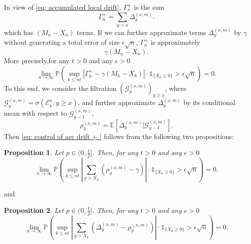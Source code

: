 \documentclass[twoside,12pt,a4paper]{article}
\newtheorem{proposition}{Proposition}[section]
\numberwithin{equation}{section}
\newcommand{\abs}[1]{\left\vert #1 \right\vert}
\begin{document}
	In view of \eqref{eq: accumulated local drift}, $\Gamma_n^+$ is the sum 
	$$
	\Gamma_n^+ = \sum_{y>x} \Delta_y^{(x,m)}.
	$$ which has $(M_n - X_n)$ terms. If we can further approximate terms $\Delta_y^{(x,m)}$ by $\gamma$ without generating a total error of size $\epsilon \sqrt{n}$, $\Gamma_n^+$ is approximately 
	$$   
	\gamma (M_n - X_n).
	$$
	More precisely,for any $t>0$ and any $\epsilon >0$
	\begin{equation}\label{eq: control of acc drift + }
		\lim_{n \to \infty }\mathbb{P}\left(\sup_{k\leq nt} \abs{\Gamma^+_k - \gamma \left(M_k - X_k \right)   }\cdot \mathbb{1}_{\{X_k\geq 0 \}} > \epsilon \sqrt{n}  \right) =0. 
	\end{equation}
	To this end, we consider the filtration $\left(\mathcal{G}_{y}^{(x,m)}\right)_{y\geq x}$, where $ \mathcal{G}_{y}^{(x,m)} = \sigma\left( \mathcal{E}^{n}_y : y \geq x \right)$, and further approximate $\Delta_y^{(x,m)}$ by its conditional mean with respect to $\mathcal{G}_{y-1}^{(x,m)}$,
	\begin{equation}\label{eq: conditional mean}
		\rho_{y}^{(x,m)}= \mathbb{E}\left[\Delta_y^{(x,m)} | \mathcal{G}_{y-1}^{(x,m)}\right].
	\end{equation}
	Then \eqref{eq: control of acc drift + } follows from the following two propositions:
	\begin{proposition}\label{lm: approximation of means of local drift}
		Let $p\in (0,\frac{1}{2}]$. Then, for any $t>0$ and any $\epsilon >0$
		\begin{equation}\label{eq: control of expected local drift}
			\lim_{n \to \infty }\mathbb{P}\left(\sup_{k\leq nt} \abs{\sum_{y> X_k} \left( \rho_{y}^{(x,m)} - \gamma  \right)   }\cdot\mathbb{1}_{\{X_k\geq 0\}} > \epsilon \sqrt{n}  \right) =0. 
		\end{equation}
	\end{proposition}
	and
	\begin{proposition}\label{lm: approx local drift by conditional means}
		Let $p\in (0,\frac{1}{2}]$. Then, for any $t>0$ and any $\epsilon >0$
		\begin{equation}\label{eq: control of martingale difference for local drift}
			\lim_{n \to \infty }\mathbb{P}\left(\sup_{k\leq nt} \abs{\sum_{y> X_k} \left(\Delta_{y}^{(x,m)}- \rho_{y}^{(x,m)} \right)   } \cdot\mathbb{1}_{\{X_k\geq 0\}} > \epsilon \sqrt{n}  \right) =0. 
		\end{equation}
	\end{proposition}
\end{document}
